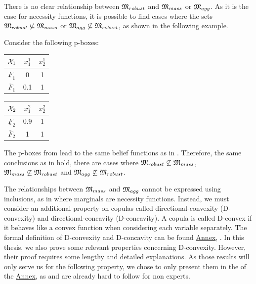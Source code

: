 There is no clear relationship between $\mathfrak{M}_{robust}$ and $\mathfrak{M}_{mass}$ or $\mathfrak{M}_{agg}$. As it is the case for necessity functions, it is possible to find cases where the sets $\mathfrak{M}_{robust}\not\subseteq \mathfrak{M}_{mass}$ or $\mathfrak{M}_{agg}\not\subseteq\mathfrak{M}_{robust}$, as shown in the following example.
\begin{example}\label{ex:pbox}
    Consider the following p-boxes:
    \begin{center}
    \begin{tabular}{|c|c|c|}
        \hline
        $\mathcal{X}_1$ & $x^1_1$ & $x^1_2$\\
        \hline\hline
        $\underline{F}_1$ & 0 & 1\\
        \hline
        $\overline{F}_1$ & 0.1 & 1\\
        \hline
    \end{tabular}
    \qquad\qquad
    \begin{tabular}{|c|c|c|}
        \hline
        $\mathcal{X}_2$ & $x^2_1$ & $x^2_2$\\
        \hline\hline
        $\underline{F}_2$ & 0.9 & 1\\
        \hline
        $\overline{F}_2$ & 1 & 1\\
        \hline
    \end{tabular}
    \label{tab:example_pbox}
    \end{center}
    The p-boxes from  lead to the same belief functions as in . Therefore, the same conclusions as in  hold, \ie there are cases where $\mathfrak{M}_{robust}\not\subseteq\mathfrak{M}_{mass}$, $\mathfrak{M}_{mass}\not\subseteq\mathfrak{M}_{robust}$ and $\mathfrak{M}_{agg}\not\subseteq\mathfrak{M}_{robust}$.
\end{example}

The relationships between $\mathfrak{M}_{mass}$ and $\mathfrak{M}_{agg}$ cannot be expressed using inclusions, as in  where marginals are necessity functions. Instead, we must consider an additional property on copulas called directional-convexity (D-convexity) and directional-concavity (D-concavity). A copula is called D-convex if it behaves like a convex function when considering each variable separately. The formal definition of D-convexity and D-concavity can be found \hyperref[chap:annex]{Annex}, . In this thesis, we also prove some relevant properties concerning D-convexity. However, their proof requires some lengthy and detailed explanations. As those results will only serve us for the following property, we chose to only present them in the  of the \hyperref[chap:annex]{Annex}, as  and  are already hard to follow for non experts.

